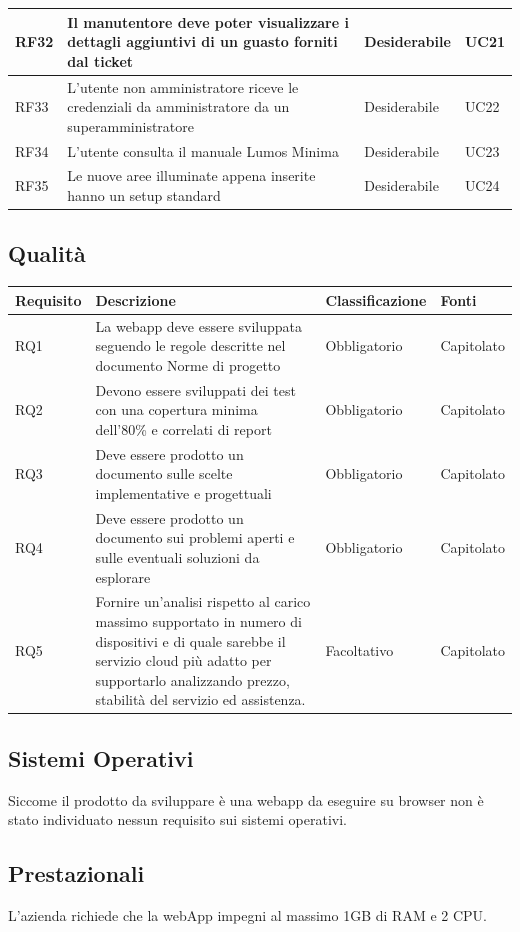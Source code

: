 \documentclass[12pt]{article}
\begin{document}
\begin{tabularx}{\linewidth}{|>{\hsize=0.6\hsize}X|>{\hsize=1.8\hsize}X|>{\hsize=1\hsize}X|>{\hsize=0.6\hsize}X|}
\hline				
RF32	 & Il manutentore deve poter visualizzare i dettagli aggiuntivi di un guasto forniti dal ticket & Desiderabile & UC21 \\
\hline				
RF33	 & L'utente non amministratore riceve le credenziali da amministratore da un superamministratore & Desiderabile & UC22 \\
\hline				
RF34	 & L'utente consulta il manuale Lumos Minima & Desiderabile & UC23 \\
\hline				
RF35	 & Le nuove aree illuminate appena inserite hanno un setup standard & Desiderabile & UC24 \\
\hline				
\end{tabularx}


\subsection{Qualità}
\begin{tabular}{ |p{1.8cm}|p{5.2cm}|p{3cm}| p{2cm}| }
\hline
Requisito& Descrizione &Classificazione &Fonti \\
\hline
RQ1 & La webapp deve essere sviluppata seguendo le regole descritte nel documento Norme di progetto & Obbligatorio & Capitolato \\
RQ2 & Devono essere sviluppati dei test con una copertura minima dell'80\% e correlati di report & Obbligatorio & Capitolato\\
RQ3 & Deve essere prodotto un documento sulle scelte implementative e progettuali & Obbligatorio & Capitolato \\
RQ4 & Deve essere prodotto un documento sui problemi aperti e sulle eventuali soluzioni da esplorare & Obbligatorio & Capitolato \\
RQ5 & Fornire un’analisi rispetto al carico massimo supportato in numero di dispositivi e di quale sarebbe il servizio cloud più adatto per supportarlo analizzando prezzo, stabilità del servizio ed assistenza.  &  Facoltativo & Capitolato \\
\hline

\end{tabular}
\subsection{Sistemi Operativi}
Siccome il prodotto da sviluppare è una webapp da eseguire su browser non è stato individuato nessun requisito sui sistemi operativi.
\subsection{Prestazionali}
L'azienda richiede che la webApp impegni al massimo 1GB di RAM e 2 CPU.
\end{document}
